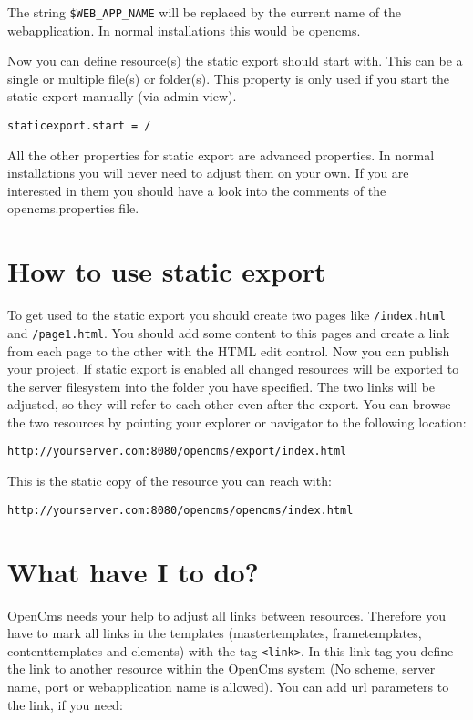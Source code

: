 The string \texttt{\${WEB\_APP\_NAME}} will be replaced by the current name of the webapplication. In normal installations this would be opencms.

Now you can define resource(s) the static export should start with. This can be a single or multiple file(s) or folder(s). This property is only used if you start the static export manually (via admin view).

\texttt{staticexport.start = /}

All the other properties for static export are advanced properties. In normal installations you will never need to adjust them on your own. If you are interested in them you should have a look into the comments of the opencms.properties file.

\section{How to use static export}

To get used to the static export you should create two pages like \texttt{/index.html} and \texttt{/page1.html}. You should add some content to this pages and create a link from each page to the other with the HTML edit control. Now you can publish your project. If static export is enabled all changed resources will be exported to the server filesystem into the folder you have specified. The two links will be adjusted, so they will refer to each other even after the export. You can browse the two resources by pointing your explorer or navigator to the following location:

\texttt{http://yourserver.com:8080/opencms/export/index.html}

This is the static copy of the resource you can reach with:

\texttt{http://yourserver.com:8080/opencms/opencms/index.html}

\section{What have I to do?}
OpenCms needs your help to adjust all links between resources. Therefore you have to mark all links in the templates (mastertemplates, frametemplates, contenttemplates and elements) with the tag \texttt{<link>}. In this link tag you define the link to another resource within the OpenCms system (No scheme, server name, port or webapplication name is allowed). You can add url parameters to the link, if you need:

